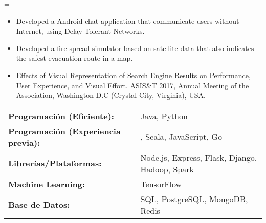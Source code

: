 \documentclass[]{cv-format}
\begin{document}
	\vspace{\separationAfterHeaderBeforeItem}
	\begin{itemize}
		\parskip=\separationBetweenItems
			\begin{itemize}[label=\textbullet]
				\itemsep0em
				\item Developed a Android chat application that communicate users without Internet, using Delay Tolerant Networks.
			\end{itemize}
	
		\vspace{\separationBetweenItems}	
			\begin{itemize}[label=\textbullet]
				\itemsep0em
				\item Developed a fire spread simulator based on satellite data that also indicates the safest evacuation route in a map.
			\end{itemize}


		\vspace{\separationBetweenItems}	
			\begin{itemize}[label=\textbullet]
				\itemsep0em
				\item Effects of Visual Representation of Search Engine Results on Performance, User Experience, and Visual Effort. ASIS\&T 2017,  Annual Meeting of the Association, Washington D.C (Crystal City, Virginia), USA.
			\end{itemize}
		\end{itemize}	

	\medskip
	\hspace{\hseparationBeforeTabular}
		\begin{tabular}{ l l }
		\textbullet\hspace{0.4em}\textbf{Programación (Eficiente):} & Java, Python \\
		\textbullet\hspace{0.4em}\textbf{Programación (Experiencia previa):} & \CPP, Scala, JavaScript, Go \\
		\textbullet\hspace{0.4em}\textbf{Librerías/Plataformas:} & Node.js, Express, Flask, Django, Hadoop, Spark \\
		\textbullet\hspace{0.4em}\textbf{Machine Learning:} & TensorFlow \\
		\textbullet\hspace{0.4em}\textbf{Base de Datos:} &SQL, PostgreSQL, MongoDB, Redis \\
		\end{tabular}
	
	
\end{document}

